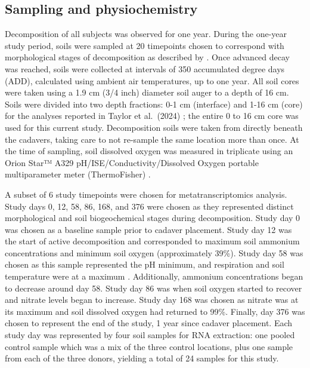 \documentclass[
  sn-nature,
  lineno, referee]{sn-jnl}
\begin{document}
\subsection{Sampling and
physiochemistry}\label{sampling-and-physiochemistry}

Decomposition of all subjects was observed for one year. During the
one-year study period, soils were sampled at 20 timepoints chosen to
correspond with morphological stages of decomposition as described by
\citep{payne_summer_1965}. Once advanced decay was reached, soils were
collected at intervals of 350 accumulated degree days (ADD), calculated
using ambient air temperatures, up to one year. All soil cores were
taken using a 1.9 cm (3/4 inch) diameter soil auger to a depth of 16 cm.
Soils were divided into two depth fractions: 0-1 cm (interface) and 1-16
cm (core) for the analyses reported in Taylor et al.~(2024)
\citep{taylor_transient_2024}; the entire 0 to 16 cm core was used for
this current study. Decomposition soils were taken from directly beneath
the cadavers, taking care to not re-sample the same location more than
once. At the time of sampling, soil dissolved oxygen was measured in
triplicate using an Orion Star™ A329 pH/ISE/Conductivity/Dissolved
Oxygen portable multiparameter meter (ThermoFisher)
\citep{taylor_transient_2024}.

A subset of 6 study timepoints were chosen for metatranscriptomics
analysis. Study days 0, 12, 58, 86, 168, and 376 were chosen as they
represented distinct morphological and soil biogeochemical stages during
decomposition. Study day 0 was chosen as a baseline sample prior to
cadaver placement. Study day 12 was the start of active decomposition
and corresponded to maximum soil ammonium concentrations and minimum
soil oxygen (approximately 39\%). Study day 58 was chosen as this sample
represented the pH minimum, and respiration and soil temperature were at
a maximum \citep{taylor_transient_2024}. Additionally, ammonium
concentrations began to decrease around day 58. Study day 86 was when
soil oxygen started to recover and nitrate levels began to increase.
Study day 168 was chosen as nitrate was at its maximum and soil
dissolved oxygen had returned to 99\%. Finally, day 376 was chosen to
represent the end of the study, 1 year since cadaver placement. Each
study day was represented by four soil samples for RNA extraction: one
pooled control sample which was a mix of the three control locations,
plus one sample from each of the three donors, yielding a total of 24
samples for this study.
\end{document}
